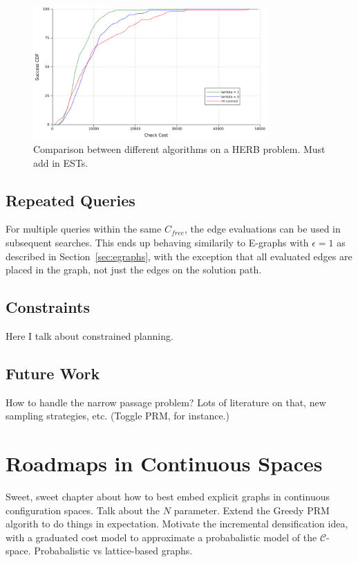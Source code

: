 \documentclass{report}
\begin{document}
\begin{figure}
\centering
\includegraphics[width=0.8\textwidth]{figs/timegreedy-herbstep1-comparison-cdfs.png}
\caption{Comparison between different algorithms on a HERB problem.
   Must add in ESTs.}
\label{fig:herb-comparison-cdfs}
\end{figure}

\section{Repeated Queries}

For multiple queries within the same $C_{free}$,
the edge evaluations can be used in subsequent searches.
This ends up behaving similarily to E-graphs \cite{phillips2012egraphs}
with $\epsilon=1$
as described in Section~\ref{sec:egraphs},
with the exception that all evaluated edges are placed in the graph,
not just the edges on the solution path.

\section{Constraints}
\label{sec:constraints}

Here I talk about constrained planning.

\section{Future Work}

How to handle the narrow passage problem?
Lots of literature on that, new sampling strategies, etc.
(Toggle PRM, for instance.)


\newpage
\chapter{Roadmaps in Continuous Spaces}
\label{chap:graphs-in-continuous}

Sweet, sweet chapter about how to best embed explicit graphs
in continuous configuration spaces.
Talk about the $N$ parameter.
Extend the Greedy PRM algorith to do things in expectation.
Motivate the incremental densification idea,
with a graduated cost model
to approximate a probabalistic model
of the $\mathcal{C}$-space.
Probabalistic vs lattice-based graphs.
\end{document}
